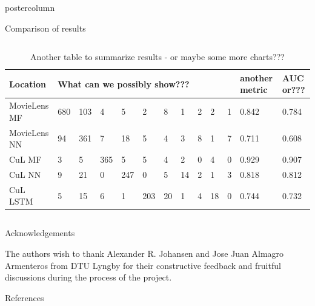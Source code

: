 \documentclass[final,hyperref={pdfpagelabels=false}]{beamer}
\begin{document}
\begin{frame}
\begin{columns}
\begin{column}{.49\paperwidth}
\begin{beamercolorbox}[center,wd=\textwidth]{postercolumn}
\begin{minipage}[T]{.99\textwidth}
{\begin{block}{Comparison of results}
\begin{columns}
\begin{column}{1\textwidth}
\centering

\centering
\begin{minipage}[t]{.95\textwidth}


\vspace{-1cm}
\begin{table}[h]
\footnotesize
\caption{Another table to summarize results - or maybe some more charts???}
\begin{tabular}{p{8cm}p{2cm}p{2cm}p{2cm}p{2cm}p{2cm}p{2cm}p{2cm}p{2cm}p{2cm}p{2cm}p{2.5cm}p{2.5cm}}
\toprule
Location      & \multicolumn{10}{l}{What can we possibly show???}        & another metric & AUC or??? \\
\midrule
MovieLens MF          & 680 & 103 & 4   & 5   & 2   & 8   & 1   & 2  & 2 & 1 & 0.842 & 0.784 \\
MovieLens NN         & 94  & 361 &  7  & 18  & 5   & 4   & 3   & 8  & 1 & 7 & 0.711 & 0.608 \\
CuL MF    & 3   & 5   & 365 &  5  & 5   & 4   & 2   & 0  & 4 & 0 & 0.929 & 0.907 \\
CuL NN     & 9   & 21  & 0   & 247 &  0  & 5   & 14  & 2  & 1 & 3 & 0.818 & 0.812 \\
CuL LSTM     & 5   & 15  & 6   & 1   & 203 & 20  & 1   & 4  & 18& 0 & 0.744 & 0.732 \\
\bottomrule

\end{tabular}
\end{table}


\end{minipage}

\end{column}
\end{columns}
\end{block}

\vfill


\begin{block}{Acknowledgements}
\centering
\begin{minipage}[t]{0.98\textwidth}

\footnotesize{The authors wish to thank Alexander R. Johansen and Jose Juan Almagro Armenteros from DTU Lyngby for their constructive feedback and fruitful discussions during the process of the project.}
\end{minipage}
\end{block}
\vfill
\begin{block}{References}

{\scriptsize
	

}			
\end{block}
\vfill


}
\end{minipage}
\end{beamercolorbox}
\end{column}
\end{columns}
\end{frame}
\end{document}
